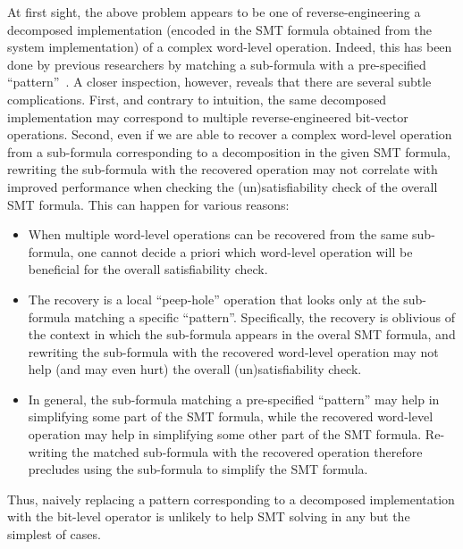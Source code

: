 At first sight, the above problem appears to be one of
reverse-engineering a decomposed implementation (encoded in the SMT
formula obtained from the system implementation) of a complex
word-level operation.  Indeed, this has been done by previous
researchers by matching a sub-formula with a pre-specified
``pattern''~\cite{earlier-pat-match-synopsys}.  A closer inspection,
however, reveals that there are several subtle complications. First,
and contrary to intuition, the same decomposed implementation may
correspond to multiple reverse-engineered bit-vector operations.
Second, even if we are able to recover a complex word-level operation
from a sub-formula corresponding to a decomposition in the given SMT
formula, rewriting the sub-formula with the recovered operation may
not correlate with improved performance when checking the
(un)satisfiability check of the overall SMT formula.  This can happen
for various reasons:
\begin{itemize}
\item When multiple word-level operations can be recovered from the
  same sub-formula, one cannot decide a priori which word-level
  operation will be beneficial for the overall satisfiability check.
\item The recovery is a local ``peep-hole'' operation that looks only
  at the sub-formula matching a specific ``pattern''.  Specifically,
  the recovery is oblivious of the context in which the sub-formula
  appears in the overal SMT formula, and rewriting the sub-formula
  with the recovered word-level operation may not help (and may even
  hurt) the overall (un)satisfiability check.  
\item In general, the sub-formula matching a pre-specified ``pattern''
  may help in simplifying some part of the SMT formula, while the
  recovered word-level operation may help in simplifying some other
  part of the SMT formula.  Re-writing the matched sub-formula with
  the recovered operation therefore precludes using the sub-formula
  to simplify the SMT formula.
\end{itemize}
Thus, naively replacing a pattern corresponding to a decomposed
implementation with the bit-level operator is unlikely to help SMT
solving in any but the simplest of cases.

